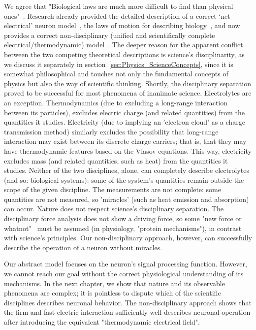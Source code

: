 We agree that "Biological laws are much more difficult to find than physical ones"~\cite{VollmerLimitsOfBiology:1995}.
Research already provided the detailed description of a correct ‘net electrical’ neuron model~\cite{VeghNeuronAlgorithms:2025}, the laws of motion for describing biology~\cite{VeghNon-ordinaryLaws:2025}, and now provides a correct non-disciplinary (unified and scientifically complete electrical/thermodynamic) model~\cite{VeghUnifiedCrossdisciplinaryModel:2026}.
The deeper reason for the apparent conflict between the two competing theoretical descriptions is science's disciplinarity, as we discuss it separately in section~\ref{sec:Physics_ScienceConcepts}, since it is somewhat philosophical and touches not only the fundamental concepts of physics but also the way of scientific thinking. Shortly, the disciplinary separation proved to be successful for
most phenomena of inanimate science. Electrolytes are an exception. Thermodynamics (due to excluding a long-range interaction between its particles), excludes electric charge (and related quantities) from
the quantities it studies. Electricity (due to implying an 'electron cloud' as a charge transmission method) similarly excludes the possibility that long-range interaction may exist between its discrete charge carriers; that is, 
that they may have thermodynamic features based on the Vlasov equations.
This way, electricity excludes mass (and related quantities, such as heat) from
the quantities it studies. Neither of the two disciplines, alone,
can completely describe electrolytes (and so: biological systems): some of the system's quantities 
remain outside the scope of the given discipline. The measurements 
are not complete: some quantities are not measured, so 'miracles' (such as heat emission and absorption)
can occur. Nature does not respect science's disciplinary separation.
The disciplinary force analysis does not show a driving force, so some "new force or whatnot"~\cite{Schrodinger:1992} must be assumed (in physiology, "protein mechanisms"), in contrast with science's principles.  Our non-disciplinary approach, however, can successfully 
describe the operation of a neuron without miracles.

Our \hypertarget{NeuronPhysical}{abstract model} focuses on the
neuron's signal processing function. However, we cannot reach our goal 
without the correct physiological understanding of its mechanisms. In the next chapter, we show that nature and its observable phenomena are complex; it is pointless to dispute
which of the scientific disciplines describes neuronal behavior. The non-disciplinary approach shows that the firm and fast electric interaction sufficiently well describes neuronal operation after introducing the equivalent "thermodynamic electrical field".

